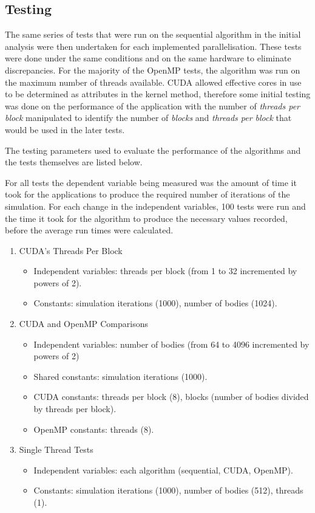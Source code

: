 \documentclass[12pt,journal,transmag]{IEEEtran}
\begin{document}
	\subsection{Testing}
	The same series of tests that were run on the sequential algorithm in the initial analysis were then undertaken for each implemented parallelisation. These tests were done under the same conditions and on the same hardware to eliminate discrepancies. For the majority of the OpenMP tests, the algorithm was run on the maximum number of threads available. CUDA allowed effective cores in use to be determined as attributes in the kernel method, therefore some initial testing was done on the performance of the application with the number of \textit{threads per block} manipulated to identify the number of \textit{blocks} and \textit{threads per block} that would be used in the later tests.
	
	The testing parameters used to evaluate the performance of the algorithms and the tests themselves are listed below.
	
	For all tests the dependent variable being measured was the amount of time it took for the applications to produce the required number of iterations of the simulation. For each change in the independent variables, 100 tests were run and the time it took for the algorithm to produce the necessary values recorded, before the average run times were calculated. 
	
	\begin{enumerate}
		\item CUDA's Threads Per Block
		\begin{itemize}
			\item 	Independent variables: threads per block (from 1 to 32 incremented by powers of 2).
			\item 	Constants: simulation iterations (1000), number of bodies (1024).
		\end{itemize}
		\item CUDA and OpenMP Comparisons
		\begin{itemize}
			\item 	Independent variables: number of bodies (from 64 to 4096 incremented by powers of 2)
			\item 	Shared constants: simulation iterations (1000).
			\item	CUDA constants: threads per block (8), blocks (number of bodies divided by threads per block).
			\item OpenMP constants: threads (8).
		\end{itemize}
		\item Single Thread Tests
		\begin{itemize}
			\item 	Independent variables: each algorithm (sequential, CUDA, OpenMP).	
			\item 	Constants: simulation iterations (1000), number of bodies (512), threads (1).
		\end{itemize}
	\end{enumerate}
	
\end{document}
